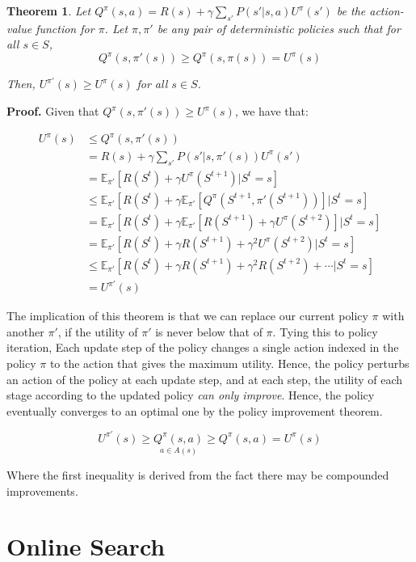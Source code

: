 \documentclass[11pt]{article}
\newtheorem{theorem}{Theorem}
\begin{document}
\begin{theorem}
Let $Q^{\pi}(s, a) = R(s) + \gamma \sum_{s'} P(s' | s, a) U^{\pi}(s')$ be the action-value function for $\pi$. Let $\pi, \pi'$ be any pair of deterministic policies such that for all $s \in S$,
$$
Q^{\pi}(s, \pi'(s)) \geq Q^{\pi}(s, \pi(s)) = U^{\pi}(s)
$$

Then, $U^{\pi'}(s) \geq U^{\pi}(s)$ for all $s\in S$.
\end{theorem}

\textbf{Proof.} Given that $Q^{\pi}(s, \pi'(s)) \geq U^{\pi}(s)$, we have that:

$$
\begin{aligned}
U^{\pi}(s) &\leq Q^{\pi}(s, \pi'(s))\\
&= R(s) + \gamma \sum_{s'} P(s' | s, \pi'(s)) U^{\pi}(s')\\
&= \mathbb{E}_{\pi'}[R(S^t) + \gamma U^{\pi}(S^{t+1}) | S^t = s]\\
&\leq \mathbb{E}_{\pi'}[R(S^t) + \gamma \mathbb{E}_{\pi'}[Q^{\pi}(S^{t+1}, \pi'(S^{t+1}))] | S^t = s]\\
&= \mathbb{E}_{\pi'}[R(S^t) + \gamma \mathbb{E}_{\pi'}[R(S^{t+1}) + \gamma U^{\pi}(S^{t+2})] | S^t = s]\\
&= \mathbb{E}_{\pi'}[R(S^t) + \gamma R(S^{t+1}) + \gamma^2 U^{\pi}(S^{t+2}) | S^t = s]\\
&\leq \mathbb{E}_{\pi'}[R(S^t) + \gamma R(S^{t+1}) + \gamma^2 R(S^{t+2}) + \cdots | S^t = s]\\
&= U^{\pi'}(s)
\end{aligned}
$$

The implication of this theorem is that we can replace our current policy $\pi$ with another $\pi'$, if the utility of $\pi'$ is never below that of $\pi$. Tying this to policy iteration, Each update step of the policy changes a single action indexed in the policy $\pi$ to the action that gives the maximum utility. Hence, the policy perturbs an action of the policy at each update step, and at each step, the utility of each stage according to the updated policy \textit{can only improve}. Hence, the policy eventually converges to an optimal one by the policy improvement theorem.

$$
U^{\pi'}(s) \geq \underset{a \in A(s)}{Q^{\pi}(s, a)} \geq Q^{\pi}(s, a) = U^{\pi}(s)
$$

Where the first inequality is derived from the fact there may be compounded improvements. 

\section{Online Search}
\end{document}
